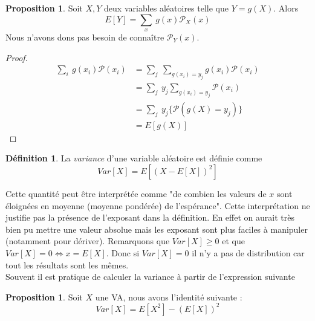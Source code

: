 \documentclass[a4paper,12pt]{report}
\theoremstyle{definition}
\renewcommand{\(}{\left(}
\renewcommand{\)}{\right)}
\renewcommand{\P}{\mathcal{P}}
\renewcommand{\d}{\textit}
\newtheorem{defn}[thm]{Définition}
\newtheorem{prop}[thm]{Proposition}
\begin{document}
            \begin{leftbar}
            \begin{prop}
                Soit $X,Y$ deux variables aléatoires telle que $Y = g(X)$. Alors
                $$E[Y] = \sum_x~g(x)\P_X(x)$$
                Nous n'avons dons pas besoin de connaître $\P_Y(x)$.
            \end{prop}
            \end{leftbar}
            
            \begin{proof}
                \begin{align*}
                    \sum_i~g(x_i)\P(x_i)&= \sum_j~\sum_{g(x_i) = y_j}g(x_i) \P(x_i)\\
                    &= \sum_j~y_j \sum_{g(x_i) = y_j} \P(x_i)\\
                    &= \sum_j~y_j \{\P(g(X) = y_j)\}\\
                    &= E[g(X)]
                \end{align*}
            \end{proof}
            
            \begin{leftbar}
                \begin{defn}
                    La \d{variance} d'une variable aléatoire est définie comme
                    $$Var[X] = E[(X-E[X])^2]$$
                \end{defn}
            \end{leftbar}
            
            Cette quantité peut être interprétée comme "de combien les valeurs de $x$ sont éloignées en moyenne (moyenne pondérée) de l'espérance". Cette interprétation ne justifie pas la présence de l'exposant dans la définition. En effet on aurait très bien pu mettre une valeur absolue mais les exposant sont plus faciles à manipuler (notamment pour dériver). Remarquons que $Var[X] \geq0$ et que $Var[X] = 0 \Leftrightarrow  x = E[X]$. Donc si $Var[X] = 0$ il n'y a pas de distribution car tout les résultats sont les mêmes.\\
            Souvent il est pratique de calculer la variance à partir de l'expression suivante
            \begin{leftbar}
            \begin{prop} Soit $X$ une VA, nous avons l'identité suivante :
                $$Var[X] = E[X^2]-(E[X])^2$$
            \end{prop}
            \end{leftbar}
            
\end{document}
